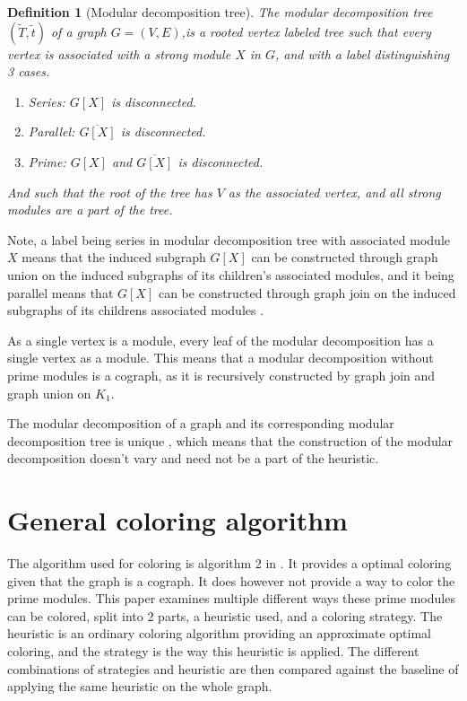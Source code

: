 \documentclass[a4paper]{article}
\newtheorem{definition}{Definition}[section]
\newcommand{\T}{\widetilde{T}}
\renewcommand{\t}{\widetilde{t}}
\begin{document}
\begin{definition}[Modular decomposition tree]{\cite{HCL}}
    The modular decomposition tree $(\T,\t)$ of a graph $G = (V,E)$,is a rooted
    vertex labeled tree such that every vertex is associated with a strong
    module $X$ in $G$, and with a label distinguishing 3 cases.
    \begin{enumerate}
        \item Series: $G[X]$ is disconnected.
        \item Parallel: $\overline{G[X]}$ is disconnected.
        \item Prime: $G[X]$ and $\overline{G[X]}$ is disconnected.
    \end{enumerate}
    And such that the root of the tree has $V$ as the associated vertex, and all 
    strong modules are a part of the tree.
\end{definition}

Note, a label being series in modular decomposition tree with associated module
$X$ means that the induced subgraph $G[X]$ can be constructed through graph
union on the induced subgraphs of its children's associated modules, and it being
parallel means that $G[X]$ can be constructed through graph join on the
induced subgraphs of its childrens associated modules \cite{HCL}.

As a single vertex is a module, every leaf of the modular decomposition has
a single vertex as a module. This means that a modular decomposition without
prime modules is a cograph, as it is recursively constructed by graph join and
graph union on $K_1$.

The modular decomposition of a graph and its corresponding modular
decomposition tree is unique \cite{MDUnique}, which means that the construction
of the modular decomposition doesn't vary and need not be a part of
the heuristic.


\section{General coloring algorithm}

The algorithm used for coloring is algorithm 2 in \cite{HCL}. It provides a
optimal coloring given that the graph is a cograph. It does however not
provide a way to color the prime modules. This paper examines multiple different
ways these prime modules can be colored, split into 2 parts, a heuristic used,
and a coloring strategy. The heuristic is an ordinary coloring algorithm
providing an approximate optimal coloring, and the strategy is the way this
heuristic is applied. The different combinations of strategies and heuristic are
then compared against the baseline of applying the same heuristic on the whole
graph.
\end{document}
